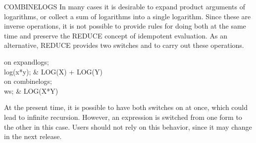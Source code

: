 \begin{Switch}[combinelogs]{COMBINELOGS}
In many cases it is desirable to expand product arguments of logarithms,
or collect a sum of logarithms into a single logarithm.  Since these are
inverse operations, it is not possible to provide rules for doing both at
the same time and preserve the REDUCE concept of idempotent evaluation.
As an alternative, REDUCE provides two switches  and
 to carry out these operations.
\begin{Examples}
on expandlogs; \\
log(x*y); & LOG(X) + LOG(Y) \\
on combinelogs; \\
ws; & LOG(X*Y)
\end{Examples}

\begin{Comments}
At the present time, it is possible to have both switches on at once,
which could lead to infinite recursion.  However, an expression is
switched from one form to the other in this case.  Users should not rely
on this behavior, since it may change in the next release.
\end{Comments}

\end{Switch}


